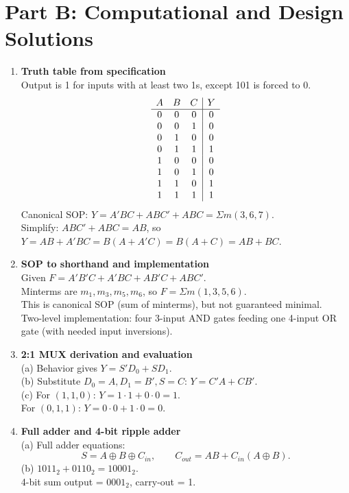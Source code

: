 \documentclass[11pt]{article}
\begin{document}
\section*{Part B: Computational and Design Solutions}
\begin{enumerate}[label=\textbf{B\arabic*.}]
  \item \textbf{Truth table from specification}\\
  Output is 1 for inputs with at least two 1s, except 101 is forced to 0.
  \[
  \begin{array}{c c c|c}
  A & B & C & Y\\\hline
  0&0&0&0\\
  0&0&1&0\\
  0&1&0&0\\
  0&1&1&1\\
  1&0&0&0\\
  1&0&1&0\\
  1&1&0&1\\
  1&1&1&1
  \end{array}
  \]
  Canonical SOP: \(Y = A'BC + ABC' + ABC = \Sigma m(3,6,7)\).\\
  Simplify: \(ABC'+ABC=AB\), so \(Y=AB + A'BC = B(A + A'C)=B(A+C)=AB+BC\).

  \item \textbf{SOP to shorthand and implementation}\\
  Given \(F=A'B'C + A'BC + AB'C + ABC'\).\\
  Minterms are \(m_1, m_3, m_5, m_6\), so \(F=\Sigma m(1,3,5,6)\).\\
  This is canonical SOP (sum of minterms), but not guaranteed minimal.\\
  Two-level implementation: four 3-input AND gates feeding one 4-input OR gate (with needed input inversions).

  \item \textbf{2:1 MUX derivation and evaluation}\\
  (a) Behavior gives \(Y=S'D_0 + SD_1\).\\
  (b) Substitute \(D_0=A, D_1=B', S=C\): \(Y=C'A + CB'\).\\
  (c) For \((1,1,0)\): \(Y=1\cdot1 + 0\cdot0=1\).\\
  For \((0,1,1)\): \(Y=0\cdot0 + 1\cdot0=0\).

  \item \textbf{Full adder and 4-bit ripple adder}\\
  (a) Full adder equations:
  \[
  S=A\oplus B\oplus C_{in},\qquad
  C_{out}=AB + C_{in}(A\oplus B).
  \]
  (b) \(1011_2 + 0110_2 = 10001_2\).\\
  4-bit sum output = \(0001_2\), carry-out = 1.


\end{enumerate}
\end{document}
